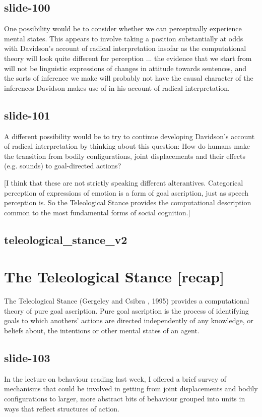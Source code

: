 \documentclass[12pt,\papersize]{extarticle}
\begin{document}
\subsection{slide-100}
One possibility would be to consider whether we can
perceptually experience mental states.
This appears to involve taking a position substantially at odds with Davidson’s account
of radical interpretation insofar as the computational theory will look
quite different for perception ... the evidence that we start from will
not be linguistic expressions of changes in attitude towards sentences,
and the sorts of inference we make will probably not have the causal character
of the inferences Davidson makes use of in his account of radical interpretation.

\subsection{slide-101}
A different possibility would be to try to continue developing Davidson’s account of
radical interpretation by thinking about this question:
How do humans make the transition from bodily configurations, joint displacements
and their effects (e.g. sounds) to goal-directed actions?

[I think that these are not strictly speaking different alterantives.
Categorical perception of expressions of emotion is a form of goal ascription,
just as speech perception is.
So the Teleological Stance provides the computational description common to the
most fundamental forms of social cognition.]

\subsection{teleological\_stance\_v2}


\section{The Teleological Stance [recap]}

The Teleological Stance (Gergeley and Csibra , 1995) provides a computational
theory of pure goal ascription.
Pure goal ascription is the process of identifying goals to which anothers’
actions are directed independently of any knowledge, or beliefs about,
the intentions or other mental states of an agent.

\subsection{slide-103}
In the lecture on behaviour reading last week, I offered a brief survey
of mechanisms that could be involved in getting from joint displacements and
bodily configurations to larger, more abstract bits of behaviour grouped into
units in ways that reflect structures of action.
\end{document}
